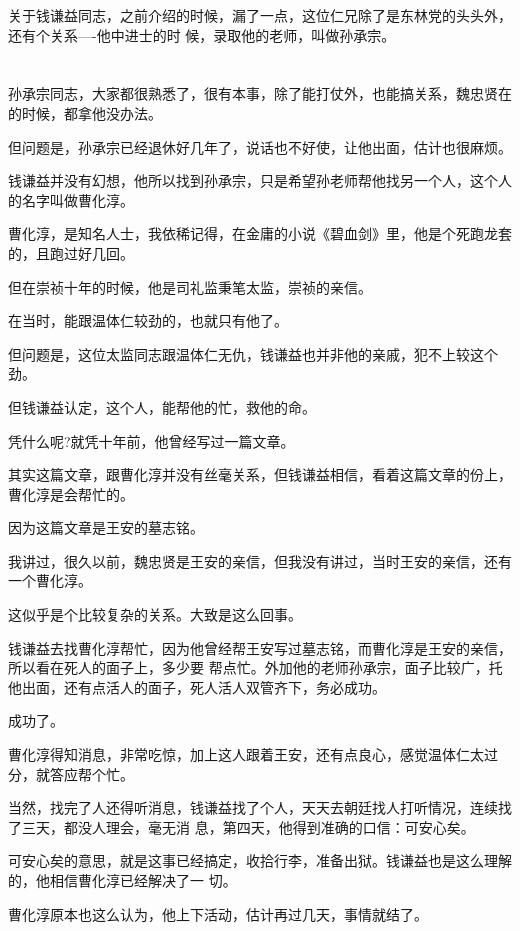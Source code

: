 \documentclass[11pt,a4paper,onecolumn]{article}
\begin{document}
关于钱谦益同志，之前介绍的时候，漏了一点，这位仁兄除了是东林党的头头外，还有个关系----他中进士的时
候，录取他的老师，叫做孙承宗。

\section[\thesection]{}

孙承宗同志，大家都很熟悉了，很有本事，除了能打仗外，也能搞关系，魏忠贤在的时候，都拿他没办法。

但问题是，孙承宗已经退休好几年了，说话也不好使，让他出面，估计也很麻烦。

钱谦益并没有幻想，他所以找到孙承宗，只是希望孙老师帮他找另一个人，这个人的名字叫做曹化淳。

曹化淳，是知名人士，我依稀记得，在金庸的小说《碧血剑》里，他是个死跑龙套的，且跑过好几回。

但在崇祯十年的时候，他是司礼监秉笔太监，崇祯的亲信。

在当时，能跟温体仁较劲的，也就只有他了。

但问题是，这位太监同志跟温体仁无仇，钱谦益也并非他的亲戚，犯不上较这个劲。

但钱谦益认定，这个人，能帮他的忙，救他的命。

凭什么呢?就凭十年前，他曾经写过一篇文章。

其实这篇文章，跟曹化淳并没有丝毫关系，但钱谦益相信，看着这篇文章的份上，曹化淳是会帮忙的。

因为这篇文章是王安的墓志铭。

我讲过，很久以前，魏忠贤是王安的亲信，但我没有讲过，当时王安的亲信，还有一个曹化淳。

这似乎是个比较复杂的关系。大致是这么回事。

钱谦益去找曹化淳帮忙，因为他曾经帮王安写过墓志铭，而曹化淳是王安的亲信，所以看在死人的面子上，多少要
帮点忙。外加他的老师孙承宗，面子比较广，托他出面，还有点活人的面子，死人活人双管齐下，务必成功。

成功了。

曹化淳得知消息，非常吃惊，加上这人跟着王安，还有点良心，感觉温体仁太过分，就答应帮个忙。

当然，找完了人还得听消息，钱谦益找了个人，天天去朝廷找人打听情况，连续找了三天，都没人理会，毫无消
息，第四天，他得到准确的口信：可安心矣。

可安心矣的意思，就是这事已经搞定，收拾行李，准备出狱。钱谦益也是这么理解的，他相信曹化淳已经解决了一
切。

曹化淳原本也这么认为，他上下活动，估计再过几天，事情就结了。
\end{document}
